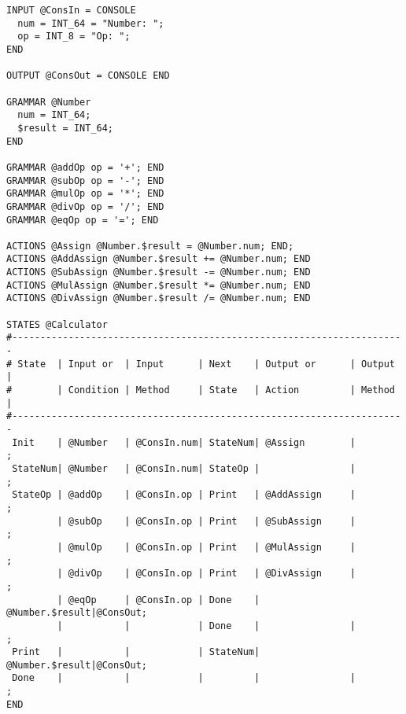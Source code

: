 \begin{lstlisting}[basicstyle=\small,caption={TEBNF grammar describing a calculator.},label=ExampleCalculator]
INPUT @ConsIn = CONSOLE
  num = INT_64 = "Number: ";
  op = INT_8 = "Op: ";
END

OUTPUT @ConsOut = CONSOLE END

GRAMMAR @Number
  num = INT_64;
  $result = INT_64;
END

GRAMMAR @addOp op = '+'; END
GRAMMAR @subOp op = '-'; END
GRAMMAR @mulOp op = '*'; END
GRAMMAR @divOp op = '/'; END
GRAMMAR @eqOp op = '='; END

ACTIONS @Assign @Number.$result = @Number.num; END;
ACTIONS @AddAssign @Number.$result += @Number.num; END
ACTIONS @SubAssign @Number.$result -= @Number.num; END
ACTIONS @MulAssign @Number.$result *= @Number.num; END
ACTIONS @DivAssign @Number.$result /= @Number.num; END

STATES @Calculator
#----------------------------------------------------------------------
# State  | Input or  | Input      | Next    | Output or      | Output |
#        | Condition | Method     | State   | Action         | Method |
#----------------------------------------------------------------------
 Init    | @Number   | @ConsIn.num| StateNum| @Assign        |        ;
 StateNum| @Number   | @ConsIn.num| StateOp |                |        ;
 StateOp | @addOp    | @ConsIn.op | Print   | @AddAssign     |        ;
         | @subOp    | @ConsIn.op | Print   | @SubAssign     |        ;
         | @mulOp    | @ConsIn.op | Print   | @MulAssign     |        ;
         | @divOp    | @ConsIn.op | Print   | @DivAssign     |        ;
         | @eqOp     | @ConsIn.op | Done    | @Number.$result|@ConsOut;
         |           |            | Done    |                |        ;
 Print   |           |            | StateNum| @Number.$result|@ConsOut;
 Done    |           |            |         |                |        ;
END
\end{lstlisting}

